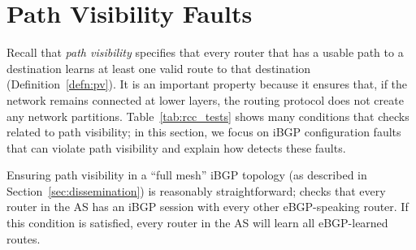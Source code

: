 \section{Path Visibility Faults}\label{sec:visibility}

Recall that {\em path visibility} specifies that every router that has a
usable path to a destination learns at least one valid route to that
destination (Definition~\ref{defn:pv}). It is an important property
because it ensures that, if the network remains connected at lower
layers, the routing protocol does not create any network partitions.
Table~\ref{tab:rcc_tests} shows many conditions that \rcc checks related
to path visibility; in this section, we focus on iBGP configuration
faults that can violate path visibility and explain how \rcc detects
these faults.


Ensuring path visibility in a ``full mesh'' iBGP topology (as described
in Section~\ref{sec:dissemination}) is reasonably
straightforward; \rcc checks that every router in the AS has an iBGP
session with every other eBGP-speaking router.  If this condition is
satisfied, every router in the AS will learn all eBGP-learned routes.


